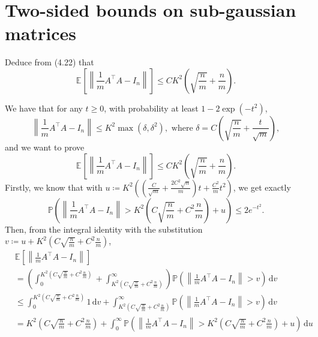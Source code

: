 \section{Two-sided bounds on sub-gaussian matrices}
\begin{problem*}[Exercise 4.6.2]\label{ex4.6.2}
	Deduce from (4.22) that
	\[
		\mathbb{E}_{}\left[\left\lVert \frac{1}{m}A ^{\top} A - I_n \right\rVert \right]
		\leq CK^2 \left( \sqrt{\frac{n}{m}} + \frac{n}{m} \right) .
	\]
\end{problem*}
\begin{answer}
	We have that for any \(t \geq 0\), with probability at least \(1 - 2 \exp (- t^2)\),
	\[
		\left\lVert \frac{1}{m}A^{\top} A - I_n \right\rVert
		\leq K^2 \max (\delta , \delta ^2), \text{ where }
		\delta = C \left( \sqrt{\frac{n}{m}} + \frac{t}{\sqrt{m} } \right),
	\]
	and we want to prove
	\[
		\mathbb{E}_{}\left[\left\lVert \frac{1}{m}A^{\top} A - I_n \right\rVert \right]
		\leq C K^2 \left( \sqrt{\frac{n}{m}} + \frac{n}{m} \right) .
	\]
	Firstly, we know that with \(u \coloneqq K^2 ((\frac{C}{\sqrt{m} } + \frac{2C^2 \sqrt{n} }{m})t + \frac{C^2}{m}t^2)\), we get exactly
	\[
		\mathbb{P} \left( \left\lVert \frac{1}{m} A^{\top} A - I_n \right\rVert > K^2 \left( C \sqrt{\frac{n}{m}} + C^2 \frac{n}{m} \right) + u \right)
		\leq 2 e^{-t^2}.
	\]
	Then, from the integral identity with the substitution \(v \coloneqq u + K^2 ( C \sqrt{\frac{n}{m}} + C^2 \frac{n}{m})\),
	\begin{align*}
		 & \mathbb{E}_{}\left[\left\lVert \frac{1}{m}A^{\top} A - I_n \right\rVert \right]                                                                                                                                                               \\
		 & = \left( \int_{0}^{K^2 (C \sqrt{\frac{n}{m}} + C^2 \frac{n}{m})} + \int_{K^2 (C \sqrt{\frac{n}{m}} + C^2 \frac{n}{m})}^{\infty} \right) \mathbb{P} \left( \left\lVert \frac{1}{m}A^{\top} A - I_n \right\rVert > v \right)  \,\mathrm{d}v     \\
		 & \leq \int_{0}^{K^2 (C \sqrt{\frac{n}{m}} + C^2 \frac{n}{m})} 1 \,\mathrm{d}v + \int_{K^2 (C \sqrt{\frac{n}{m}} + C^2 \frac{n}{m})}^{\infty} \mathbb{P} \left( \left\lVert \frac{1}{m}A^{\top} A - I_n \right\rVert > v \right)  \,\mathrm{d}v \\
		 & = K^2 \left( C \sqrt{\frac{n}{m}} + C^2 \frac{n}{m} \right) + \int_{0}^{\infty} \mathbb{P} \left( \left\lVert \frac{1}{m}A^{\top} A - I_n \right\rVert > K^2 \left( C \sqrt{\frac{n}{m}} + C^2 \frac{n}{m} \right) + u \right)  \,\mathrm{d}u \\

\end{align*}
\end{answer}
